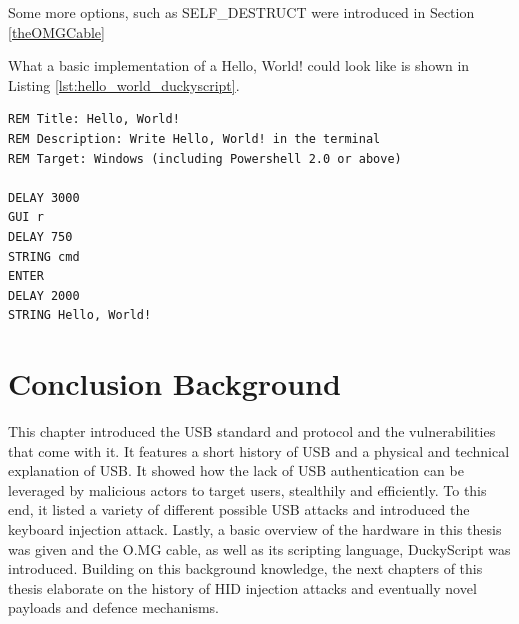 Some more options, such as SELF\_DESTRUCT were introduced in Section \ref{theOMGCable}

What a basic implementation of a Hello, World! could look like is shown in Listing \ref{lst:hello_world_duckyscript}.

\begin{lstlisting}[caption={Hello, World! in DuckyScript 1.0}, label={lst:hello_world_duckyscript}, captionpos=b]
REM Title: Hello, World!
REM Description: Write Hello, World! in the terminal
REM Target: Windows (including Powershell 2.0 or above)

DELAY 3000
GUI r
DELAY 750
STRING cmd
ENTER
DELAY 2000
STRING Hello, World!
\end{lstlisting}



\section{Conclusion Background}

This chapter introduced the USB standard and protocol and the vulnerabilities that come with it. It features a short history of USB and a physical and technical explanation of USB. It showed how the lack of USB authentication can be leveraged by malicious actors to target users, stealthily and efficiently. To this end, it listed a variety of different possible USB attacks and introduced the keyboard injection attack.
Lastly, a basic overview of the hardware in this thesis was given and the O.MG cable, as well as its scripting language, DuckyScript was introduced. 
Building on this background knowledge, the next chapters of this thesis elaborate on the history of HID injection attacks and eventually novel payloads and defence mechanisms. 